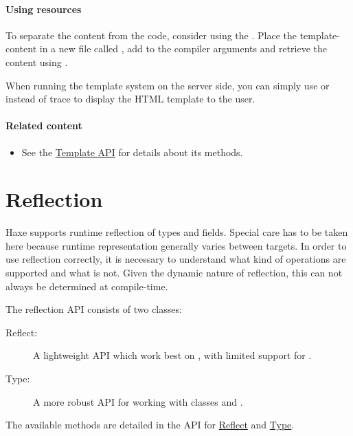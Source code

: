 \paragraph{Using resources}

To separate the content from the code, consider using the . 
Place the template-content in a new file called , add  to the compiler arguments and retrieve the content using .

When running the template system on the server side, you can simply use  or  instead of trace to display the HTML template to the user.

\paragraph{Related content}
\begin{itemize}
	\item See the \href{https://api.haxe.org/haxe/Template.html}{Template API} for details about its methods.
\end{itemize}

\section{Reflection}
\label{std-reflection}

Haxe supports runtime reflection of types and fields. Special care has to be taken here because runtime representation generally varies between targets. In order to use reflection correctly, it is necessary to understand what kind of operations are supported and what is not. Given the dynamic nature of reflection, this can not always be determined at compile-time.

The reflection API consists of two classes:

\begin{description}
	\item[Reflect:] A lightweight API which work best on , with limited support for . 
	\item[Type:] A more robust API for working with classes and .
\end{description}

The available methods are detailed in the API for \href{https://api.haxe.org/Reflect.html}{Reflect} and \href{https://api.haxe.org/Type.html}{Type}.

